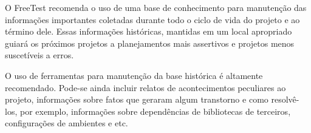 O FreeTest recomenda o uso de uma base de conhecimento para manutenção das informações importantes coletadas durante todo o ciclo de vida do projeto e ao término dele. Essas informações históricas, mantidas em um local apropriado guiará os próximos projetos a planejamentos mais assertivos e projetos menos suscetíveis a erros.

O uso de ferramentas para manutenção da base histórica é altamente recomendado. Pode-se ainda incluir relatos de acontecimentos peculiares ao projeto, informações sobre fatos que geraram algum transtorno e como resolvê-los, por exemplo, informações sobre dependências de bibliotecas de terceiros, configurações de ambientes e etc.








